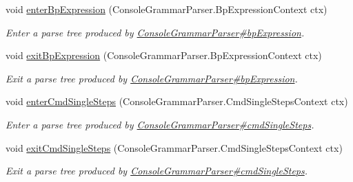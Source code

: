 \begin{DoxyCompactItemize}
void \hyperlink{interfacegov_1_1nasa_1_1jpf_1_1inspector_1_1client_1_1parser_1_1_console_grammar_listener_adf23767b96be814be16d12a5f3c4fb8c}{enter\+Bp\+Expression} (Console\+Grammar\+Parser.\+Bp\+Expression\+Context ctx)
\begin{DoxyCompactList}\small\item\em Enter a parse tree produced by \hyperlink{classgov_1_1nasa_1_1jpf_1_1inspector_1_1client_1_1parser_1_1_console_grammar_parser_af8f413ff85d64783d9625af4ca4b1f06}{Console\+Grammar\+Parser\#bp\+Expression}. \end{DoxyCompactList}\item 
void \hyperlink{interfacegov_1_1nasa_1_1jpf_1_1inspector_1_1client_1_1parser_1_1_console_grammar_listener_a3f756f884bd7e395457d2efda28105cc}{exit\+Bp\+Expression} (Console\+Grammar\+Parser.\+Bp\+Expression\+Context ctx)
\begin{DoxyCompactList}\small\item\em Exit a parse tree produced by \hyperlink{classgov_1_1nasa_1_1jpf_1_1inspector_1_1client_1_1parser_1_1_console_grammar_parser_af8f413ff85d64783d9625af4ca4b1f06}{Console\+Grammar\+Parser\#bp\+Expression}. \end{DoxyCompactList}\item 
void \hyperlink{interfacegov_1_1nasa_1_1jpf_1_1inspector_1_1client_1_1parser_1_1_console_grammar_listener_ac2f6c00a2fb98a3d09af7d74814ff679}{enter\+Cmd\+Single\+Steps} (Console\+Grammar\+Parser.\+Cmd\+Single\+Steps\+Context ctx)
\begin{DoxyCompactList}\small\item\em Enter a parse tree produced by \hyperlink{classgov_1_1nasa_1_1jpf_1_1inspector_1_1client_1_1parser_1_1_console_grammar_parser_a38d3ee70cf1cb2a77d6de42788941648}{Console\+Grammar\+Parser\#cmd\+Single\+Steps}. \end{DoxyCompactList}\item 
void \hyperlink{interfacegov_1_1nasa_1_1jpf_1_1inspector_1_1client_1_1parser_1_1_console_grammar_listener_a980225b3e43d632162f05186247c4cf3}{exit\+Cmd\+Single\+Steps} (Console\+Grammar\+Parser.\+Cmd\+Single\+Steps\+Context ctx)
\begin{DoxyCompactList}\small\item\em Exit a parse tree produced by \hyperlink{classgov_1_1nasa_1_1jpf_1_1inspector_1_1client_1_1parser_1_1_console_grammar_parser_a38d3ee70cf1cb2a77d6de42788941648}{Console\+Grammar\+Parser\#cmd\+Single\+Steps}. \end{DoxyCompactList}\item 

\end{DoxyCompactItemize}
